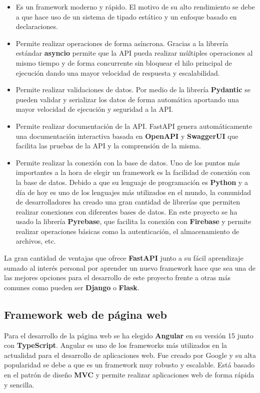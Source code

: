 \begin{itemize}
    \item Es un framework moderno y rápido. El motivo de su alto rendimiento se debe a que hace uso de un sistema
    de tipado estático y un enfoque basado en declaraciones.
    \item Permite realizar operaciones de forma asíncrona. Gracias a la librería estándar \textbf{asyncio} permite que
    la API pueda realizar múltiples operaciones al mismo tiempo y de forma concurrente sin bloquear el hilo principal
    de ejecución dando una mayor velocidad de respuesta y escalabilidad.
    \item Permite realizar validaciones de datos. Por medio de la librería \textbf{Pydantic} se pueden
    validar y serializar los datos de forma automática aportando una mayor velocidad de ejecución y seguridad a la API.
    \item Permite realizar documentación de la API. FastAPI genera automáticamente una documentación interactiva
    basada en \textbf{OpenAPI} y \textbf{SwaggerUI} que facilita las pruebas de la API y la comprensión de la misma.
    \item Permite realizar la conexión con la base de datos. Uno de los puntos más importantes a la hora de elegir un
    framework es la facilidad de conexión con la base de datos. Debido a que su lenguaje de programación es \textbf{Python}
    y a día de hoy es uno de los lenguajes más utilizados en el mundo, la comunidad de desarrolladores ha creado
    una gran cantidad de librerías que permiten realizar conexiones con diferentes bases de datos. En este proyecto se ha
    usado la librería \textbf{Pyrebase}, que facilita la conexión con \textbf{Firebase} y permite realizar operaciones
    básicas como la autenticación, el almacenamiento de archivos, etc.
\end{itemize}

La gran cantidad de ventajas que ofrece \textbf{FastAPI} junto a su fácil aprendizaje sumado al interés personal
por aprender un nuevo framework hace que sea una de las mejores opciones para el desarrollo de este proyecto
frente a otras más comunes como pueden ser \textbf{Django} o \textbf{Flask}.

\subsection{Framework web de página web}\label{subsec:framework-web-de-pagina-web}

Para el desarrollo de la página web se ha elegido \textbf{Angular} en su versión 15 junto con \textbf{TypeScript}.
Angular es uno de los frameworks más utilizados en la actualidad para el desarrollo de aplicaciones web. Fue creado
por Google y su alta popularidad se debe a que es un framework muy robusto y escalable. Está basado en el patrón
de diseño \textbf{MVC} y permite realizar aplicaciones web de forma rápida y sencilla. \\

